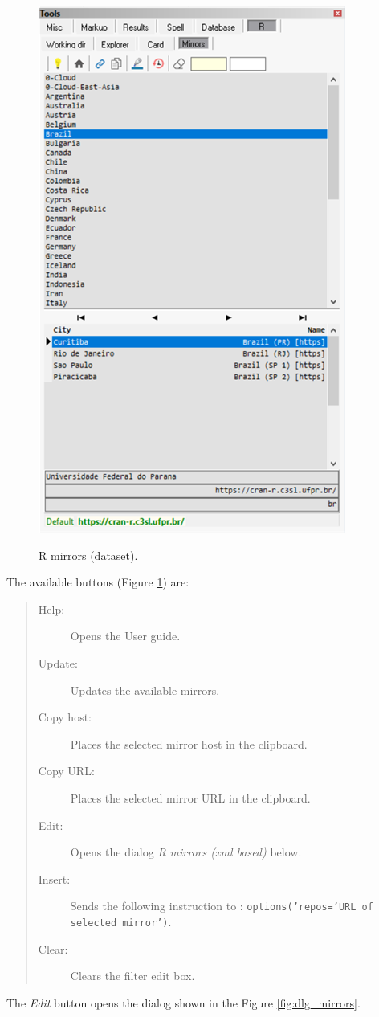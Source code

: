 \begin{figure}[H]
  \includegraphics[scale=0.6]{./res/tools_r_mirrors.png}\\
  \caption{R mirrors (dataset).}
  \label{fig:tools_dlg_mirrors}
\end{figure}

The available buttons
(Figure \ref{fig:tools_dlg_mirrors})
are:

\begin{quote}
  \begin{footnotesize}
    \begin{description}
      \item[Help:]
        Opens the User guide.
      \item[Update:]
        Updates the available \RR{} mirrors.
      \item[Copy host:]
        Places the selected mirror host in the clipboard.
      \item[Copy URL:]
        Places the selected mirror URL in the clipboard.
      \item[Edit:]
        Opens the dialog \textit{R mirrors (xml based)} below.
      \item[Insert:]
        Sends the following instruction to \RR{}: \texttt{options('repos='URL of selected mirror')}.
      \item [Clear:]
        Clears the filter edit box.
    \end{description}
  \end{footnotesize}
\end{quote}

The \textit{Edit} button opens the dialog shown in the Figure \ref{fig:dlg_mirrors}.
